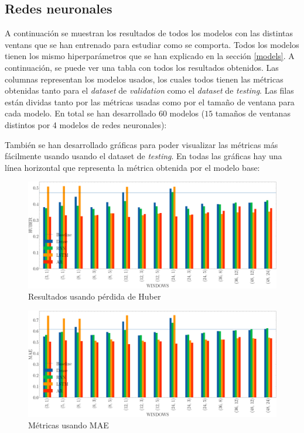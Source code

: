 \subsection{Redes neuronales}

A continuación se muestran los resultados de todos los modelos con las distintas ventans que se han entrenado para estudiar como se comporta. Todos los modelos tienen los mismo hiperparámetros que se han explicado en la sección \ref{models}. A continuación, se puede ver una tabla con todos los resultados obtenidos. Las columnas representan los modelos usados, los cuales todos tienen las métricas obtenidas tanto para el \textit{dataset} de \textit{validation} como el \textit{dataset} de \textit{testing}. Las filas están dividas tanto por las métricas usadas como por el tamaño de ventana para cada modelo. En total se han desarrollado $60$ modelos ($15$ tamaños de ventanas distintos por 4 modelos de redes neuronales):



También se han desarrollado gráficas para poder visualizar las métricas más fácilmente usando usando el dataset de \textit{testing}. En todas las gráficas hay una línea horizontal que representa la métrica obtenida por el modelo base:



\begin{figure}[H]
    \centering
    \includegraphics[width=15cm]{images/solution/metrics/HUBER.png}
    \caption{Resultados usando pérdida de Huber}
\end{figure}

\begin{figure}[H]
    \centering
    \includegraphics[width=15cm]{images/solution/metrics/MAE.png}
    \caption{Métricas usando MAE}
\end{figure}

